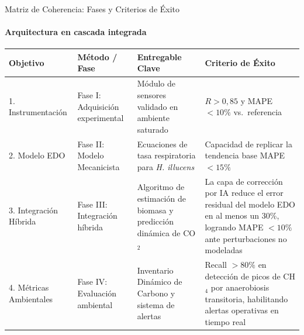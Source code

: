 \documentclass[aspectratio=169, 11pt]{beamer}
\begin{document}
\begin{frame}{Matriz de Coherencia: Fases y Criterios de Éxito}
\framesubtitle{Arquitectura en cascada integrada}

\centering
\scriptsize
\renewcommand{\arraystretch}{1.2}
\begin{tabular}{|p{2.6cm}|p{2.8cm}|p{3.8cm}|p{2.8cm}|}
\hline
\textbf{Objetivo} & \textbf{Método / Fase} & \textbf{Entregable Clave} & \textbf{Criterio de Éxito} \\
\hline
1. Instrumentación & Fase I: Adquisición experimental & Módulo de sensores validado en ambiente saturado & $R > 0{,}85$ y MAPE $< 10\%$ vs.\ referencia \\
\hline
2. Modelo EDO & Fase II: Modelo Mecanicista & Ecuaciones de tasa respiratoria para \textit{H. illucens} & Capacidad de replicar la tendencia base MAPE $ < 15\%$ \\
\hline
3. Integración Híbrida & Fase III: Integración híbrida & Algoritmo de estimación de biomasa y predicción dinámica de CO$_2$ & La capa de corrección por IA reduce el error residual del modelo EDO en al menos un 30\%, logrando MAPE $< 10\%$ ante perturbaciones no modeladas \\
\hline
4. Métricas Ambientales & Fase IV: Evaluación ambiental & Inventario Dinámico de Carbono y sistema de alertas & Recall $> 80\%$ en detección de picos de CH$_4$ por anaerobiosis transitoria, habilitando alertas operativas en tiempo real \\
\hline
\end{tabular}

\end{frame}

\end{document}
